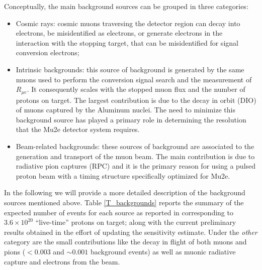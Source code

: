 \documentclass[12pt,a4paper,openright, oneside, titlepage]{book} %
\begin{document}
\noindent Conceptually, the main background sources can be grouped in three categories: 

\begin{itemize}
\item Cosmic rays: cosmic muons traversing the detector region can decay into electrons, be misidentified as electrons, or generate electrons in the interaction with the stopping target, that can be misidentified for signal conversion electrons; 
\item Intrinsic backgrounds: this source of background is generated by the same muons used to perform the conversion signal search and the measurement of $R_{\mu e}$. 
It consequently scales with the stopped muon flux and the number of protons on target. 
The largest contribution is due to the decay in orbit (DIO) of muons captured by the Aluminum nuclei. 
The need to minimize this background source has played a primary role in determining the resolution that the Mu2e detector system requires.
\item Beam-related backgrounds: these sources of background are associated to the generation and transport of the muon beam. 
The main contribution is due to radiative pion captures (RPC) and it is the primary reason for using a pulsed proton beam with a timing structure specifically optimized  for Mu2e. 
\end{itemize}
In the following we will provide a more detailed description of the background sources mentioned above.
Table \ref{T_backgrounds} reports the summary of the expected number of events for each source as reported in \cite{CD3} corresponding to $3.6 \times 10^{20}$ ``live-time'' protons on target; along with the current preliminary results obtained in the effort of updating the sensitivity estimate. 
Under the \textit{other} category are the small contributions like the decay in flight of both muons and pions ($<0.003$ and $\sim 0.001$ background events) as well as muonic radiative capture and electrons from the beam.
\end{document}
